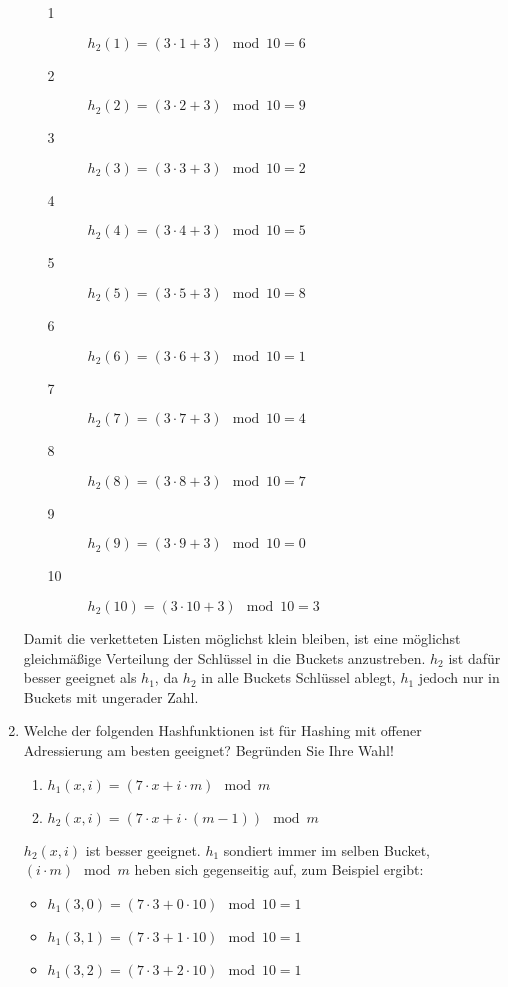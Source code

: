 \documentclass{lehramt-informatik-aufgabe}
\begin{document}
\begin{enumerate}
\begin{enumerate}
\begin{antwort}
\begin{description}
\item[1] $h_2(1) = (3 \cdot 1 + 3) \mod 10 = 6$
\item[2] $h_2(2) = (3 \cdot 2 + 3) \mod 10 = 9$
\item[3] $h_2(3) = (3 \cdot 3 + 3) \mod 10 = 2$
\item[4] $h_2(4) = (3 \cdot 4 + 3) \mod 10 = 5$
\item[5] $h_2(5) = (3 \cdot 5 + 3) \mod 10 = 8$
\item[6] $h_2(6) = (3 \cdot 6 + 3) \mod 10 = 1$
\item[7] $h_2(7) = (3 \cdot 7 + 3) \mod 10 = 4$
\item[8] $h_2(8) = (3 \cdot 8 + 3) \mod 10 = 7$
\item[9] $h_2(9) = (3 \cdot 9 + 3) \mod 10 = 0$
\item[10] $h_2(10) = (3 \cdot 10 + 3) \mod 10 = 3$
\end{description}
\end{antwort}
\end{enumerate}

\begin{antwort}
Damit die verketteten Listen möglichst klein bleiben, ist eine möglichst
gleichmäßige Verteilung der Schlüssel in die Buckets anzustreben. $h_2$
ist dafür besser geeignet als $h_1$, da $h_2$ in alle Buckets Schlüssel
ablegt, $h_1$ jedoch nur in Buckets mit ungerader Zahl.
\end{antwort}


\item Welche der folgenden Hashfunktionen ist für Hashing mit offener
Adressierung am besten geeignet? Begründen
Sie Ihre Wahl!

\begin{enumerate}
\item $h_1(x,i) = (7 \cdot x + i \cdot m) \mod m$
\item $h_2(x,i) = (7 \cdot x + i \cdot (m - 1)) \mod m$
\end{enumerate}

\begin{antwort}
$h_2(x,i)$ ist besser geeignet. $h_1$ sondiert immer im selben Bucket,
$(i \cdot m) \mod m$ heben sich gegenseitig auf,
zum Beispiel ergibt:

\begin{itemize}
\item $h_1(3,0) = (7 \cdot 3 + 0 \cdot 10) \mod 10 = 1$
\item $h_1(3,1) = (7 \cdot 3 + 1 \cdot 10) \mod 10 = 1$
\item $h_1(3,2) = (7 \cdot 3 + 2 \cdot 10) \mod 10 = 1$
\end{itemize}


\end{antwort}
\end{enumerate}
\end{document}

